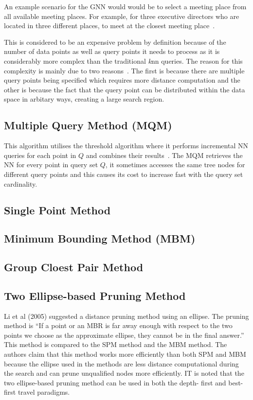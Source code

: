\documentclass[a4paper,11pt]{article}
\begin{document}
An example scenario for the GNN would would be to select a meeting place from
all available meeting places. For example, for three executive directors who
are located in three different places, to meet at the closest meeting
place~\cite{taniar2013taxonomy}.

This is considered to be an expensive problem by definition because of the
number of data points as well as query points it needs to process as it is
considerably more complex than the traditional \textit{k}nn queries. The
reason for this complexity is mainly due to two reasons~\cite{li2005two}. The
first is because there are multiple query points being specified which
requires more distance computation and the other is because the fact that the
query point can be distributed within the data space in arbitary ways,
creating a large search region.


\subsection{Multiple Query Method (MQM)}

This algorithm utilises the threshold algorithm where it performs incremental
NN queries for each point in $Q$ and combines their
results~\cite{papadias2004group}. The MQM retrieves the NN for every point in
query set $Q$, it sometimes accesses the same tree nodes for different query
points and this causes its cost to increase fast with the query set
cardinality.

\subsection{Single Point Method}

\subsection{Minimum Bounding Method (MBM)}

\subsection{Group Cloest Pair Method}

\subsection{Two Ellipse-based Pruning Method}

Li et al (2005) suggested a distance pruning method using an ellipse. The
pruning method is ``If a point or an MBR is far away enough with respect to
the two points we choose as the approximate ellipse, they cannot be in the
final answer.'' This method is compared to the SPM method and the MBM method.
The authors claim that this method works more efficiently than both SPM and
MBM because the ellipse used in the methods are less distance computational
during the search and can prune unqualified nodes more efficiently. IT is
noted that the two ellipse-based pruning method can be used in both the depth-
first and best-first travel paradigms.
\end{document}
